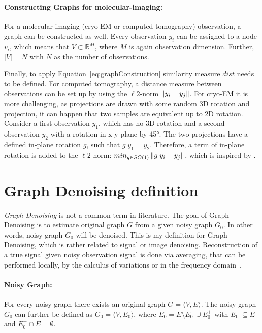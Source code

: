 \paragraph{Constructing Graphs for molecular-imaging:}
For a molecular-imaging (cryo-EM or computed tomography) observation, a graph can be constructed as well.
Every observation $y_i$ can be assigned to a node $v_i$, which means that $V \subset \mathbb{R}^M$, where 
$M$ is again observation dimension. 
Further, $|V|=N$ with $N$ as the number of observations.

Finally, to apply Equation~\ref{eq:graphConstruction} similarity measure $dist$ needs to be defined.
For computed tomography, a distance measure between observations can be set up by using the $\ell2$-norm $\left\lVert y_i - y_j\right\rVert$.
For cryo-EM it is more challenging, as projections are drawn with some random 3D rotation and projection, 
it can happen that two samples are equivalent up to 2D rotation. 
Consider a first observation $y_1$, which has no 3D rotation and 
a second observation $y_2$ with a rotation in x-y plane by 45°.
The two projections have a defined in-plane rotation $g$, such that $g \; y_1 = y_2$.
Therefore, a term of in-plane rotation is added to the $\ell2$-norm: $min_{g \in SO(1)}\left\lVert g \;y_i - y_j\right\rVert$, 
which is inspired by \cite{multiDiffusionMaps}. 


\section{Graph Denoising definition}

\textit{Graph Denoising} is not a common term in literature.
The goal of Graph Denoising is to estimate original graph $G$ from a given noisy graph $G_0$.
In other words, noisy graph $G_0$ will be denoised.
This is my definition for Graph Denoising, which is rather related to signal or image denoising.
Reconstruction of a true signal given noisy observation signal is done via averaging, that can be performed
locally, by the calculus of variations or in the frequency domain~\cite{noneLocalMean}. 

\paragraph{Noisy Graph:}
For every noisy graph there exists an original graph $G = \langle V,E \rangle$.
The noisy graph $G_0$ can further be defined as $G_0 = \langle V, E_0 \rangle$,  
 where $E_0 = E \setminus  E^{-}_0 \cup  E^{+}_0$ with $E^{-}_0 \subseteq E$ and $E^{+}_0 \cap E = \emptyset$.

